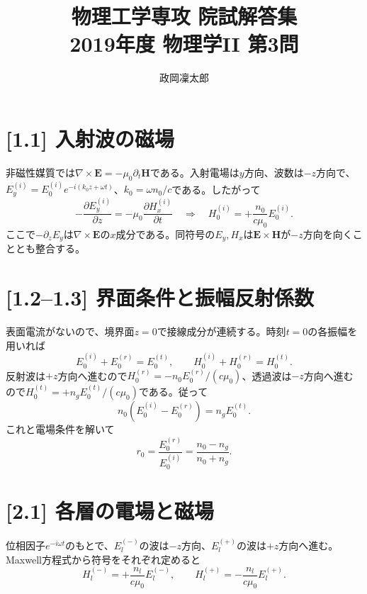 \documentclass[11pt,a4paper]{article}
\title{物理工学専攻 院試解答集\\2019年度 物理学II 第3問}
\author{政岡凜太郎}
\date{}
\begin{document}
\maketitle

\section*{[1.1] 入射波の磁場}
非磁性媒質では$\nabla\times\boldsymbol E=-\mu_0\partial_t\boldsymbol H$である。入射電場は$y$方向、波数は$-z$方向で、$E_y^{(i)}=E_0^{(i)}e^{-i(k_0z+\omega t)}$、$k_0=\omega n_0/c$である。したがって
\begin{equation}
 -\frac{\partial E_y^{(i)}}{\partial z}=-\mu_0\frac{\partial H_x^{(i)}}{\partial t}
 \quad\Longrightarrow\quad
 \boxed{H_0^{(i)}=+\frac{n_0}{c\mu_0}E_0^{(i)}}.
\end{equation}
ここで$-\partial_z E_y$は$\nabla\times\boldsymbol E$の$x$成分である。同符号の$E_y,H_x$は$\boldsymbol E\times\boldsymbol H$が$-z$方向を向くこととも整合する。

\section*{[1.2--1.3] 界面条件と振幅反射係数}
表面電流がないので、境界面$z=0$で接線成分が連続する。時刻$t=0$の各振幅を用いれば
\begin{equation}
 E_0^{(i)}+E_0^{(r)}=E_0^{(t)},\qquad
 H_0^{(i)}+H_0^{(r)}=H_0^{(t)}.
\end{equation}
反射波は$+z$方向へ進むので$H_0^{(r)}=-n_0E_0^{(r)}/(c\mu_0)$、透過波は$-z$方向へ進むので$H_0^{(t)}=+n_gE_0^{(t)}/(c\mu_0)$である。従って
\begin{equation}
 n_0(E_0^{(i)}-E_0^{(r)})=n_gE_0^{(t)}.
\end{equation}
これと電場条件を解いて
\begin{equation}
 \boxed{r_0=\frac{E_0^{(r)}}{E_0^{(i)}}=\frac{n_0-n_g}{n_0+n_g}}.
\end{equation}

\section*{[2.1] 各層の電場と磁場}
位相因子$e^{-i\omega t}$のもとで、$E_l^{(-)}$の波は$-z$方向、$E_l^{(+)}$の波は$+z$方向へ進む。Maxwell方程式から符号をそれぞれ定めると
\begin{equation}
 \boxed{H_l^{(-)}=+\frac{n_l}{c\mu_0}E_l^{(-)},\qquad
 H_l^{(+)}=-\frac{n_l}{c\mu_0}E_l^{(+)}}.
\end{equation}
\end{document}
